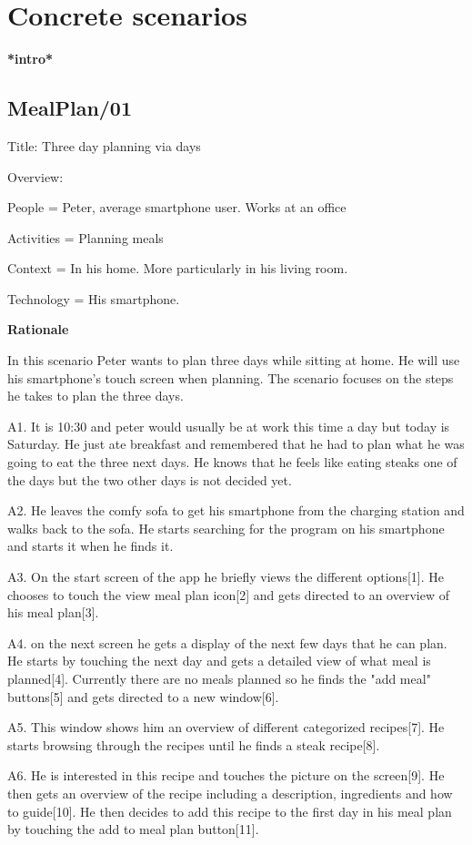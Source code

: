 \section{Concrete scenarios}
\textbf{*intro*}

\subsection{MealPlan/01} \label{MealPlan01}

Title: Three day planning via days

Overview: 

	People = Peter, average smartphone user. Works at an office
	
	Activities = Planning meals
	
	Context = In his home. More particularly in his living room.
	
	Technology = His smartphone.
	
\textbf{Rationale}

In this scenario Peter wants to plan three days while sitting at home. He will use his smartphone's touch screen when planning. The scenario focuses on the steps he takes to plan the three days.
	
	A1. It is 10:30 and peter would usually be at work this time a day but today is Saturday. He just ate breakfast and remembered that he had to plan what he was going to eat the three next days. He knows that he feels like eating steaks one of the days but the two other days is not decided yet.
	
	A2. He leaves the comfy sofa to get his smartphone from the charging station and walks back to the sofa. He starts searching for the program on his smartphone and starts it when he finds it.
	
	A3. On the start screen of the app he briefly views the different options[1]. He chooses to touch the view meal plan icon[2] and gets directed to an overview of his meal plan[3]. 
	
	A4. on the next screen he gets a display of the next few days that he can plan. He starts by touching the next day and gets a detailed view of what meal is planned[4]. Currently there are no meals planned so he finds the "add meal" buttons[5] and gets directed to a new window[6]. 
	
	A5. This window shows him an overview of different categorized recipes[7]. He starts browsing through the recipes until he finds a steak recipe[8]. 
	
	A6. He is interested in this recipe and touches the picture on the screen[9]. He then gets an overview of the recipe including a description, ingredients and how to guide[10]. He then decides to add this recipe to the first day in his meal plan by touching the add to meal plan button[11].
	
